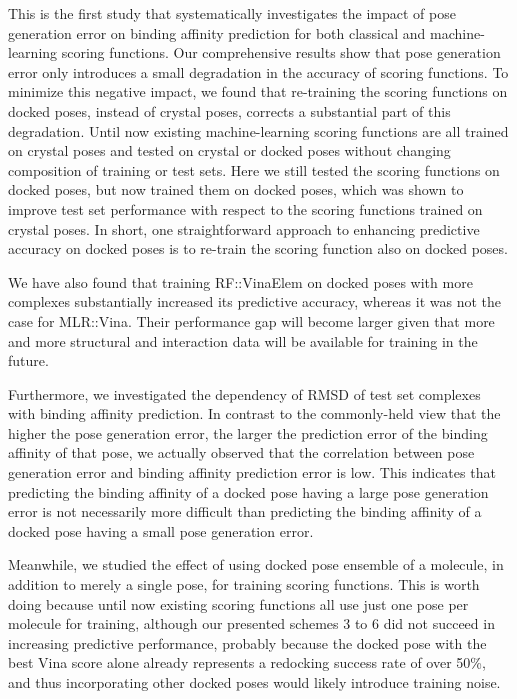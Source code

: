 \documentclass[twocolumn]{bmcart}
\begin{document}
This is the first study that systematically investigates the impact of pose generation error on binding affinity prediction for both classical and machine-learning scoring functions. Our comprehensive results show that pose generation error only introduces a small degradation in the accuracy of scoring functions. To minimize this negative impact, we found that re-training the scoring functions on docked poses, instead of crystal poses, corrects a substantial part of this degradation. Until now existing machine-learning scoring functions are all trained on crystal poses and tested on crystal or docked poses without changing composition of training or test sets. Here we still tested the scoring functions on docked poses, but now trained them on docked poses, which was shown to improve test set performance with respect to the scoring functions trained on crystal poses. In short, one straightforward approach to enhancing predictive accuracy on docked poses is to re-train the scoring function also on docked poses.

We have also found that training RF::VinaElem on docked poses with more complexes substantially increased its predictive accuracy, whereas it was not the case for MLR::Vina. Their performance gap will become larger given that more and more structural and interaction data will be available for training in the future.

Furthermore, we investigated the dependency of RMSD of test set complexes with binding affinity prediction. In contrast to the commonly-held view that the higher the pose generation error, the larger the prediction error of the binding affinity of that pose, we actually observed that the correlation between pose generation error and binding affinity prediction error is low. This indicates that predicting the binding affinity of a docked pose having a large pose generation error is not necessarily more difficult than predicting the binding affinity of a docked pose having a small pose generation error.

Meanwhile, we studied the effect of using docked pose ensemble of a molecule, in addition to merely a single pose, for training scoring functions. This is worth doing because until now existing scoring functions all use just one pose per molecule for training, although our presented schemes 3 to 6 did not succeed in increasing predictive performance, probably because the docked pose with the best Vina score alone already represents a redocking success rate of over 50\%, and thus incorporating other docked poses would likely introduce training noise. 
\end{document}

